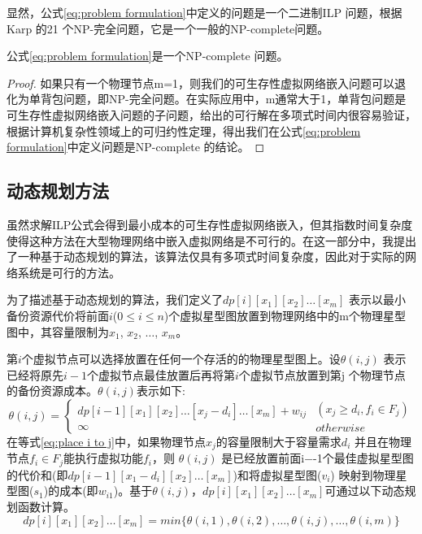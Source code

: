 显然，公式\ref{eq:problem formulation}中定义的问题是一个二进制ILP 问题，根据Karp 的21 个NP-完全问题\cite{karp1975computational}，它是一个一般的NP-complete问题。

\begin{theorem}
公式\ref{eq:problem formulation}是一个NP-complete 问题。
\end{theorem}
\begin{proof}
如果只有一个物理节点m=1，则我们的可生存性虚拟网络嵌入问题可以退化为单背包问题，即NP-完全问题。在实际应用中，m通常大于1，单背包问题是可生存性虚拟网络嵌入问题的子问题，给出的可行解在多项式时间内很容易验证，根据计算机复杂性领域上的可归约性定理\cite{wood1987theory}，得出我们在公式\ref{eq:problem formulation}中定义问题是NP-complete 的结论。
\end{proof}

\subsection{动态规划方法}
\label{lab:DynamicProgrammingEquation}
虽然求解ILP公式会得到最小成本的可生存性虚拟网络嵌入，但其指数时间复杂度使得这种方法在大型物理网络中嵌入虚拟网络是不可行的。在这一部分中，我提出了一种基于动态规划的算法，该算法仅具有多项式时间复杂度，因此对于实际的网络系统是可行的方法。

为了描述基于动态规划的算法，我们定义了$dp[i][{x_1}][{x_2}] \ldots [{x_m}]$ 表示以最小备份资源代价将前面$i$($0 \le i \le n $)个虚拟星型图放置到物理网络中的m个物理星型图中，其容量限制为$ x_1$, $ x_2$, $\ldots$, $x_m$。

第$i$个虚拟节点可以选择放置在任何一个存活的的物理星型图上。设$\theta (i,j)$ 表示已经将原先$i-1$个虚拟节点最佳放置后再将第$i$个虚拟节点放置到第j 个物理节点的备份资源成本。$\theta (i,j)$表示如下:
\begin{equation}
\theta (i,j) = \left\{ {\begin{array}{*{20}{c}}
{dp[i - 1][x_1][{x_2}] \ldots [{x_j} - {d_i}] \ldots [{x_m}] + {w_{ij}}}\\
\infty
\end{array}} \right.\begin{array}{*{20}{c}}
{({x_j} \ge {d_i},{f_i} \in {F_j})}\\
{otherwise}
\end{array}
\label{eq:place i to j}
\end{equation}
在等式\ref{eq:place i to j}中，如果物理节点$x_j$的容量限制大于容量需求$d_i$ 并且在物理节点${f_i} \in {F_j}$能执行虚拟功能$f_i$，则 $\theta (i,j)$ 是已经放置前面i−-1个最佳虚拟星型图的代价和(即$dp[i-1][{x_1} - {d_i}][{x_2}] \ldots [{x_m}]$)和将虚拟星型图($v_i$) 映射到物理星型图($s_1$)的成本(即$w_{i1}$)。基于$\theta (i,j)$，$dp[i][{x_1}][{x_2}] \ldots [{x_m}]$可通过以下动态规划函数计算。
\begin{equation}
dp[i][{x_1}][{x_2}] \ldots [{x_m}] = min\{\theta (i,1),\theta (i,2),\ldots,\theta (i,j),\ldots,\theta (i,m)\}
\label{eq:update function}
\end{equation}

